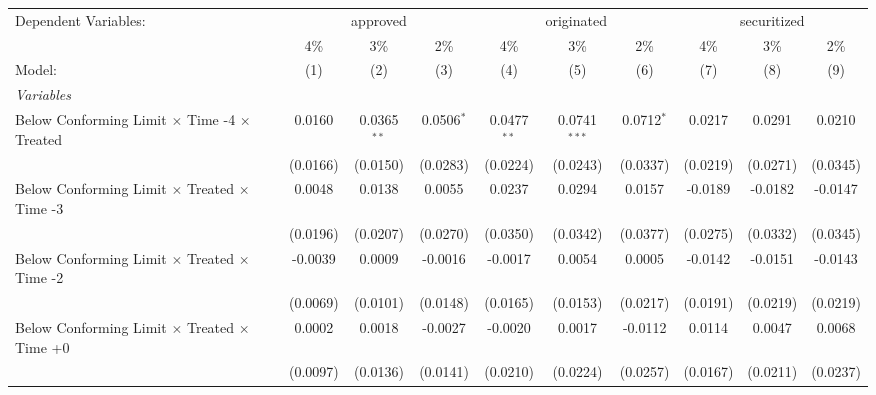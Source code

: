 \begingroup
\centering
\begin{tabular}{lccccccccc}
   \tabularnewline \midrule \midrule
   Dependent Variables: & \multicolumn{3}{c}{approved} & \multicolumn{3}{c}{originated} & \multicolumn{3}{c}{securitized}\\
                                                              & 4\%            & 3\%            & 2\%           & 4\%           & 3\%            & 2\%          & 4\%           & 3\%           & 2\% \\    
   Model:                                                     & (1)            & (2)            & (3)           & (4)           & (5)            & (6)          & (7)           & (8)           & (9)\\  
   \midrule
   \emph{Variables}\\
   Below Conforming Limit $\times$ Time -4 $\times$ Treated   & 0.0160         & 0.0365$^{**}$  & 0.0506$^{*}$  & 0.0477$^{**}$ & 0.0741$^{***}$ & 0.0712$^{*}$ & 0.0217        & 0.0291        & 0.0210\\   
                                                              & (0.0166)       & (0.0150)       & (0.0283)      & (0.0224)      & (0.0243)       & (0.0337)     & (0.0219)      & (0.0271)      & (0.0345)\\   
   Below Conforming Limit $\times$ Treated $\times$ Time -3   & 0.0048         & 0.0138         & 0.0055        & 0.0237        & 0.0294         & 0.0157       & -0.0189       & -0.0182       & -0.0147\\   
                                                              & (0.0196)       & (0.0207)       & (0.0270)      & (0.0350)      & (0.0342)       & (0.0377)     & (0.0275)      & (0.0332)      & (0.0345)\\   
   Below Conforming Limit $\times$ Treated $\times$ Time -2   & -0.0039        & 0.0009         & -0.0016       & -0.0017       & 0.0054         & 0.0005       & -0.0142       & -0.0151       & -0.0143\\   
                                                              & (0.0069)       & (0.0101)       & (0.0148)      & (0.0165)      & (0.0153)       & (0.0217)     & (0.0191)      & (0.0219)      & (0.0219)\\   
   Below Conforming Limit $\times$ Treated $\times$ Time +0   & 0.0002         & 0.0018         & -0.0027       & -0.0020       & 0.0017         & -0.0112      & 0.0114        & 0.0047        & 0.0068\\   
                                                              & (0.0097)       & (0.0136)       & (0.0141)      & (0.0210)      & (0.0224)       & (0.0257)     & (0.0167)      & (0.0211)      & (0.0237)\\   

\end{tabular}
